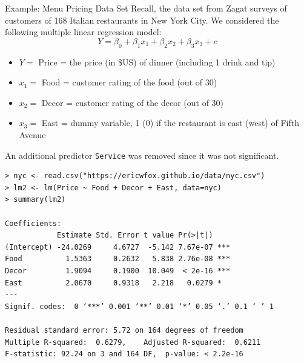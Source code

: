 \documentclass[10pt]{beamer}\usepackage[]{graphicx}\usepackage[]{color}
\begin{document}
\begin{frame}{Example: Menu Pricing Data Set}
Recall, the data set from Zagat surveys of customers of 168 Italian restaurants in New York City.  We considered the following multiple linear regression model:
$$Y = \beta_0 + \beta_1 x_1 + \beta_2 x_2 + \beta_3 x_3 + e$$

\begin{itemize}
\item $Y =$ Price = the price (in \$US) of dinner (including 1 drink and tip)
\item $x_1 =$ Food = customer rating of the food (out of 30)
\item $x_2 =$ Decor = customer rating of the decor (out of 30)
\item $x_3 =$ East = dummy variable, 1 (0) if the restaurant is east (west) of Fifth Avenue\\
\end{itemize}
\vspace{5pt}
An additional predictor \texttt{Service} was removed since it was not significant.
\end{frame}

\begin{frame}[fragile]
\small
\begin{verbatim}
> nyc <- read.csv("https://ericwfox.github.io/data/nyc.csv")
> lm2 <- lm(Price ~ Food + Decor + East, data=nyc)
> summary(lm2)

Coefficients:
            Estimate Std. Error t value Pr(>|t|)    
(Intercept) -24.0269     4.6727  -5.142 7.67e-07 ***
Food          1.5363     0.2632   5.838 2.76e-08 ***
Decor         1.9094     0.1900  10.049  < 2e-16 ***
East          2.0670     0.9318   2.218   0.0279 *  
---
Signif. codes:  0 ‘***’ 0.001 ‘**’ 0.01 ‘*’ 0.05 ‘.’ 0.1 ‘ ’ 1

Residual standard error: 5.72 on 164 degrees of freedom
Multiple R-squared:  0.6279,	Adjusted R-squared:  0.6211 
F-statistic: 92.24 on 3 and 164 DF,  p-value: < 2.2e-16
\end{verbatim}
\end{frame}
\end{document}
